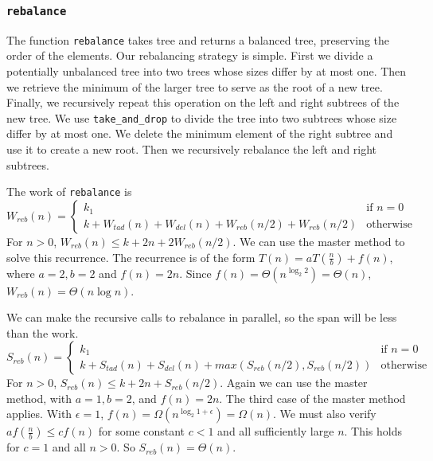 \documentclass[12pt,letterpaper]{article}
\newcommand{\T}[1]{\texttt{#1}}
\begin{document}
\subsubsection{\T{rebalance}}
The function \T{rebalance} takes tree and returns a balanced tree, preserving the order of the elements.
Our rebalancing strategy is simple. 
First we divide a potentially unbalanced tree into two trees whose sizes differ by at most one.
Then we retrieve the minimum of the larger tree to serve as the root of a new tree.
Finally, we recursively repeat this operation on the left and right subtrees of the new tree.
We use \T{take\_and\_drop} to divide the tree into two subtrees whose size differ by at most one.
We delete the minimum element of the right subtree and use it to create a new root.
Then we recursively rebalance the left and right subtrees.

The work of \T{rebalance} is
\[ W_{reb}(n) = 
  \begin{cases}
    k_1 & \text{if } n=0\\
    k + W_{tad}(n) + W_{del}(n) + W_{reb}(n/2) + W_{reb}(n/2) & \text{otherwise}
  \end{cases}
\]
For $n>0$, $W_{reb}(n) \leq k + 2n + 2W_{reb}(n/2)$.
We can use the master method to solve this recurrence.
The recurrence is of the form $T(n) = aT(\frac{n}{b}) + f(n)$, where $a=2, b=2$ and $f(n) = 2n$.
Since $f(n) = \Theta(n^{\log_2 2}) = \Theta(n)$, $W_{reb}(n) = \Theta(n\log n)$.

We can make the recursive calls to rebalance in parallel, so the span will be less than the work.
\[ S_{reb}(n) = 
  \begin{cases}
    k_1 & \text{if } n=0\\
    k + S_{tad}(n) + S_{del}(n) + max(S_{reb}(n/2),S_{reb}(n/2)) & \text{otherwise}
  \end{cases}
\]
For $n>0$, $S_{reb}(n) \leq k + 2n + S_{reb}(n/2)$.
Again we can use the master method, with $a=1, b=2$, and $f(n) = 2n$.
The third case of the master method applies.
With $\epsilon = 1$, $f(n) = \Omega(n^{\log_2 1 + \epsilon}) = \Omega(n)$.
We must also verify $a f(\frac{n}{b}) \leq c f(n)$ for some constant $c<1$ and all sufficiently large $n$.
This holds for $c=1$ and all $n>0$.
So $S_{reb}(n) = \Theta(n)$.
\end{document}
